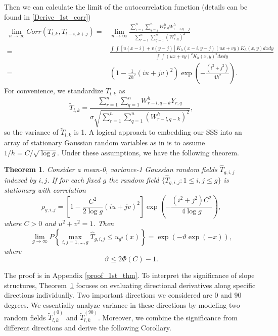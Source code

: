 \documentclass{article}
\newtheorem{theorem}{Theorem}%
\begin{document}
Then we can calculate the limit of the autocorrelation function  (details can be found in \ref{Derive_1st_corr})
\begin{equation}
	\label{eq_corr_1st}
	\begin{aligned}
		\lim_{n \to \infty}Corr(T_{l,k},T_{l+i,k+j})=&\lim_{n \to \infty}\frac{\sum_{r=i}^{n}\sum_{q=j}^{n}W^h_{r,q}W^h_{r-i,q-j}}{\sum_{r=1}^{n}\sum_{q=1}^{n}(W^h_{r,q})^2}\\
		=&\frac{\int\int[u(x-i)+v(y-j)]K_{h}(x-i,y-j)(ux+vy)K_{h}(x,y)dxdy}{\int\int(ux+vy)^2K_{h}(x,y)^2dxdy}\\
		=&(1-\frac{1}{2h^2}(iu+jv)^2)\exp(-\frac{(i^2+j^2)}{4h^2}).
	\end{aligned}
\end{equation}
For convenience, we standardize $T_{l,k}$ as
\begin{equation}
	\label{standardize_1st}
	\tilde{T}_{l,k}=\frac{\sum_{r=1}^{n}\sum_{q=1}^{n}W^h_{r-l,q-k}Y_{r,q}}{\sigma\sqrt{\sum_{r=1}^{n}\sum_{q=1}^{n}(W^h_{r-l,q-k})^2}},
\end{equation}
so the variance of $\tilde{T}_{l,k}$ is 1.
A logical approach to embedding our SSS into an array of stationary Gaussian random variables as in \citet{french2013asymptotic} is to assume $1/h=C/\sqrt{\log g}$. Under these assumptions, we have the following theorem.
\begin{theorem}
	\label{SSS_extreme_1st}
	Consider a  mean-0, variance-1 Gaussian random fields $\hat{T}_{g,i,j}$ indexed by $i,j$. If for each fixed $g$ the random field $\{\hat{T}_{g,i,j}:1\leq i,j\leq g\}$  is stationary with correlation
	\begin{equation}
		\label{eq_corr_g_1st}
		\rho_{g,i,j}=[1-\frac{C^2}{2\log g}(iu+jv)^2]\exp(-\frac{(i^2+j^2)C^2}{4\log g}),
	\end{equation}
	where $C>0$ and $u^2+v^2=1$. Then
	\begin{equation*}
		\lim_{g\rightarrow\infty}P\left\{\max_{i,j=1,...,g}\hat{T}_{g,i,j}\leq u_{g^2}(x)\right\}=\exp(-\vartheta \exp(-x)),
	\end{equation*}
	where 
	\begin{equation}
		\label{eq-vartheta-1st}
		\vartheta\leq2\Phi(C)-1.
	\end{equation}
\end{theorem}

The proof is in Appendix \ref{proof_1st_thm}. To interpret the significance of slope structures, Theorem~\ref{SSS_extreme_1st} focuses on evaluating directional derivatives along specific directions individually. Two important directions we considered are $0$  and $90$ degrees. We essentially analyze variance in these directions by modeling two random fields $\tilde{T}^{(0)}_{l,k}$ and $\tilde{T}^{(90)}_{l,k}$. Moreover, we combine the significance from different directions and derive the following Corollary. 
\end{document}
